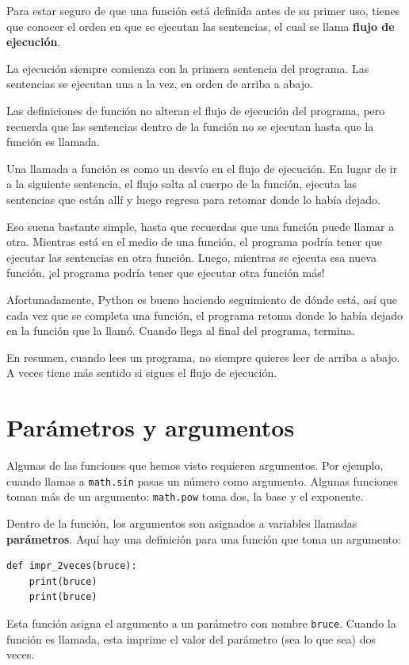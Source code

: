\documentclass[10pt]{book}
\begin{document}
Para estar seguro de que una función está definida antes de su primer uso,
tienes que conocer el orden en que se ejecutan las sentencias, el cual se
llama {\bf flujo de ejecución}.

La ejecución siempre comienza con la primera sentencia del programa.
Las sentencias se ejecutan una a la vez, en orden de arriba a abajo.

Las definiciones de función no alteran el flujo de ejecución del
programa, pero recuerda que las sentencias dentro de la función no
se ejecutan hasta que la función es llamada.

Una llamada a función es como un desvío en el flujo de ejecución. En lugar de ir
a la siguiente sentencia, el flujo salta al cuerpo de
la función, ejecuta las sentencias que están allí y luego regresa
para retomar donde lo había dejado.

Eso suena bastante simple, hasta que recuerdas que una función puede
llamar a otra.  Mientras está en el medio de una función, el programa podría
tener que ejecutar las sentencias en otra función.  Luego, mientras
se ejecuta esa nueva función, ¡el programa podría tener que ejecutar
otra función más!

Afortunadamente, Python es bueno haciendo seguimiento de dónde está, así que cada
vez que se completa una función, el programa retoma donde lo había dejado en
la función que la llamó.  Cuando llega al final del programa,
termina.

En resumen, cuando lees un programa,
no siempre quieres leer de arriba a abajo.  A veces tiene
más sentido si sigues el flujo de ejecución.


\section{Parámetros y argumentos}
\label{parameters}

Algunas de las funciones que hemos visto requieren argumentos. Por
ejemplo, cuando llamas a {\tt math.sin} pasas un número
como argumento.  Algunas funciones toman más de un argumento:
{\tt math.pow} toma dos, la base y el exponente.

Dentro de la función, los argumentos son asignados a
variables llamadas {\bf parámetros}.  Aquí hay una definición para
una función que toma un argumento:

\begin{verbatim}
def impr_2veces(bruce):
    print(bruce)
    print(bruce)
\end{verbatim}
%
Esta función asigna el argumento a un parámetro
con nombre {\tt bruce}.  Cuando la función es llamada, esta imprime el valor del
parámetro (sea lo que sea) dos veces.
\end{document}
